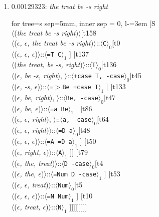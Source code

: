 \documentclass[11pt]{article}
\begin{document}
\begin{enumerate}
	\item  0.00129323: \textit{the treat be -s right} \\[0.5em]
	\begin{adjustbox}{max width = \textwidth}
	\begin{forest}
	for tree={s sep=5mm, inner sep = 0, l-=3em}
	[S\\$\langle$(\textit{the treat be -s right})$\rangle$[t158\\$\langle$(\textit{$\epsilon${,} $\epsilon${,} the treat be -s right})$\rangle$::$\langle$\texttt{C}$\rangle_0$[t0\\$\langle$(\textit{$\epsilon${,} $\epsilon${,} $\epsilon$})$\rangle$::$\langle$\texttt{{=}T C}$\rangle_1$ ] [t137\\$\langle$(\textit{the treat{,} be -s{,} right})$\rangle$::$\langle$\texttt{T}$\rangle_0$[t136\\$\langle$(\textit{$\epsilon${,} be -s{,} right}){,} $\rangle$::$\langle$\texttt{+case T{,} -case}$\rangle_0$[t45\\$\langle$(\textit{$\epsilon${,} -s{,} $\epsilon$})$\rangle$::$\langle$\texttt{{=}$>$Be +case T}$\rangle_1$ ] [t133\\$\langle$(\textit{$\epsilon${,} be{,} right}){,} $\rangle$::$\langle$\texttt{Be{,} -case}$\rangle_0$[t47\\$\langle$(\textit{$\epsilon${,} be{,} $\epsilon$})$\rangle$::$\langle$\texttt{{=}a Be}$\rangle_1$ ] [t86\\$\langle$(\textit{$\epsilon${,} $\epsilon${,} right}){,} $\rangle$::$\langle$\texttt{a{,} -case}$\rangle_0$[t64\\$\langle$(\textit{$\epsilon${,} $\epsilon${,} right})$\rangle$::$\langle$\texttt{{=}D a}$\rangle_0$[t48\\$\langle$(\textit{$\epsilon${,} $\epsilon${,} $\epsilon$})$\rangle$::$\langle$\texttt{{=}A {=}D a}$\rangle_1$ ] [t50\\$\langle$(\textit{$\epsilon${,} right{,} $\epsilon$})$\rangle$::$\langle$\texttt{A}$\rangle_1$ ]] [t79\\$\langle$(\textit{$\epsilon${,} the{,} treat})$\rangle$::$\langle$\texttt{D -case}$\rangle_0$[t4\\$\langle$(\textit{$\epsilon${,} the{,} $\epsilon$})$\rangle$::$\langle$\texttt{{=}Num D -case}$\rangle_1$ ] [t53\\$\langle$(\textit{$\epsilon${,} $\epsilon${,} treat})$\rangle$::$\langle$\texttt{Num}$\rangle_0$[t5\\$\langle$(\textit{$\epsilon${,} $\epsilon${,} $\epsilon$})$\rangle$::$\langle$\texttt{{=}N Num}$\rangle_1$ ] [t10\\$\langle$(\textit{$\epsilon${,} treat{,} $\epsilon$})$\rangle$::$\langle$\texttt{N}$\rangle_1$ ]]]]]]]]]

\end{forest}
\end{adjustbox}
\end{enumerate}
\end{document}
